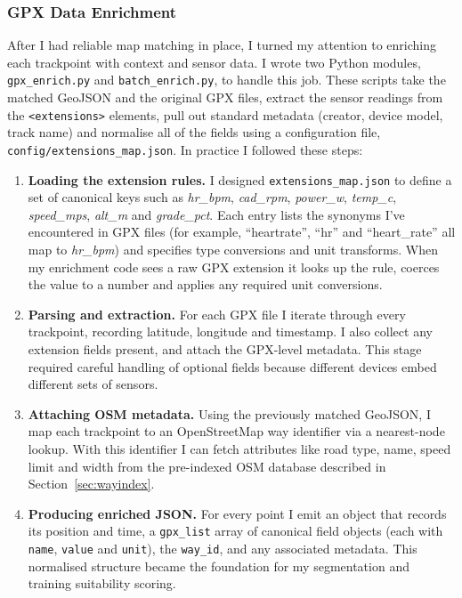 \documentclass[11pt,twoside]{report}
\begin{document}
\subsubsection{GPX Data Enrichment}\label{sec:gpx_enrich}
After I had reliable map matching in place, I turned my attention to enriching each trackpoint with context and sensor data. I wrote two Python modules, \texttt{gpx\_enrich.py} and \texttt{batch\_enrich.py}, to handle this job. These scripts take the matched GeoJSON and the original GPX files, extract the sensor readings from the \texttt{<extensions>} elements, pull out standard metadata (creator, device model, track name) and normalise all of the fields using a configuration file, \texttt{config/extensions\_map.json}. In practice I followed these steps:
\begin{enumerate}
	\item \textbf{Loading the extension rules.} I designed \texttt{extensions\_map.json} to define a set of canonical keys such as \emph{hr\_bpm}, \emph{cad\_rpm}, \emph{power\_w}, \emph{temp\_c}, \emph{speed\_mps}, \emph{alt\_m} and \emph{grade\_pct}. Each entry lists the synonyms I've encountered in GPX files (for example, ``heartrate'', ``hr'' and ``heart\_rate'' all map to \emph{hr\_bpm}) and specifies type conversions and unit transforms. When my enrichment code sees a raw GPX extension it looks up the rule, coerces the value to a number and applies any required unit conversions.
	\item \textbf{Parsing and extraction.} For each GPX file I iterate through every trackpoint, recording latitude, longitude and timestamp. I also collect any extension fields present, and attach the GPX-level metadata. This stage required careful handling of optional fields because different devices embed different sets of sensors.
	\item \textbf{Attaching OSM metadata.} Using the previously matched GeoJSON, I map each trackpoint to an OpenStreetMap way identifier via a nearest-node lookup. With this identifier I can fetch attributes like road type, name, speed limit and width from the pre-indexed OSM database described in Section~\ref{sec:wayindex}.
	\item \textbf{Producing enriched JSON.} For every point I emit an object that records its position and time, a \texttt{gpx\_list} array of canonical field objects (each with \texttt{name}, \texttt{value} and \texttt{unit}), the \texttt{way\_id}, and any associated metadata. This normalised structure became the foundation for my segmentation and training suitability scoring.
\end{enumerate}
\end{document}
